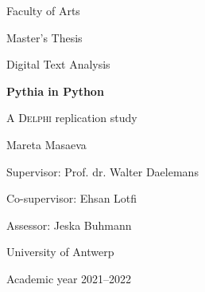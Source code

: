 \thispagestyle{plain}
    \begin{center}
    
        \vspace*{1cm}

        \large
        Faculty of Arts
        
        \vspace{0.5cm}
        Master’s Thesis 
        
        \vspace{0.5cm}
        Digital Text Analysis 
        
       \vspace{1.5cm}
            
        \Huge
        \textbf{Pythia in Python}
            
        \vspace{0.5cm}
        \LARGE
        A \textsc{Delphi} replication study
            
        \vspace{1.5cm}
        
        \Large    
        Mareta Masaeva
        
        \vspace{0.5cm}
        
        \large
        Supervisor: Prof. dr. Walter Daelemans
        
        \vspace{0.5cm}
        Co-supervisor: Ehsan Lotfi
        
        \vspace{0.5cm}
        Assessor: Jeska Buhmann
        
        \vspace{1cm}
        University of Antwerp
        
        \vspace{1cm}   
        Academic year 2021–2022
            
    \end{center}